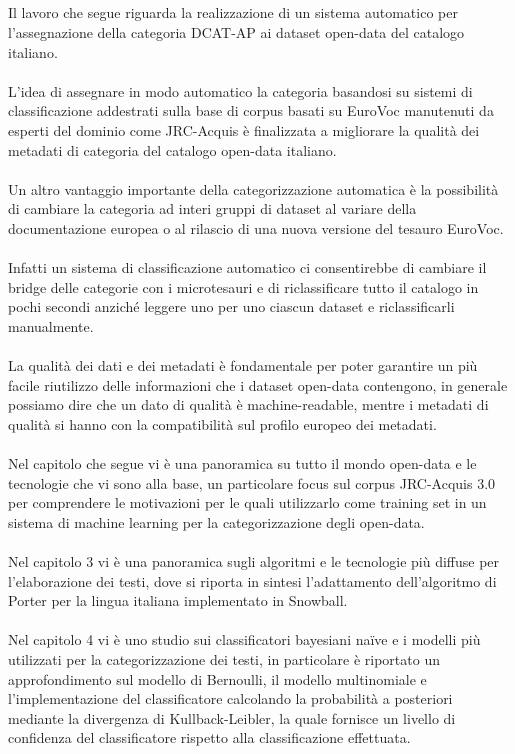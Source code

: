 \documentclass{article}
\theoremstyle{plain}
\theoremstyle{definition}
\begin{document}
\\
\\
\\
\\
Il lavoro che segue riguarda la realizzazione di un sistema automatico per l'assegnazione della categoria DCAT-AP ai dataset open-data del catalogo italiano.
\\
\\
L'idea di assegnare in modo automatico la categoria basandosi su sistemi di classificazione addestrati sulla base di corpus basati su EuroVoc manutenuti da esperti del dominio come JRC-Acquis è finalizzata a migliorare la qualità dei metadati di categoria del catalogo open-data italiano.
\\
\\
Un altro vantaggio importante della categorizzazione automatica è la possibilità di cambiare la categoria ad interi gruppi di dataset al variare della documentazione europea o al rilascio di una nuova versione del tesauro EuroVoc.
\\
\\
Infatti un sistema di classificazione automatico ci consentirebbe di cambiare il bridge delle categorie con i microtesauri e di riclassificare tutto il catalogo in pochi secondi anziché leggere uno per uno ciascun dataset e riclassificarli manualmente.
\\
\\
La qualità dei dati e dei metadati è fondamentale per poter garantire un più facile riutilizzo delle informazioni che i dataset open-data contengono, in generale possiamo dire che un dato di qualità è machine-readable, mentre i metadati di qualità si hanno con la compatibilità sul profilo europeo dei metadati.
\\
\\
Nel capitolo che segue vi è una panoramica su tutto il mondo open-data e le tecnologie che vi sono alla base, un particolare focus sul corpus JRC-Acquis 3.0 per comprendere le motivazioni per le quali utilizzarlo come training set in un sistema di machine learning per la categorizzazione degli open-data.
\\
\\
Nel capitolo 3 vi è una panoramica sugli algoritmi e le tecnologie più diffuse per l'elaborazione dei testi, dove si riporta in sintesi l'adattamento dell'algoritmo di Porter per la lingua italiana implementato in Snowball.
\\
\\
Nel capitolo 4 vi è uno studio sui classificatori bayesiani naïve e i modelli più utilizzati per la categorizzazione dei testi, in particolare è riportato un approfondimento sul modello di Bernoulli, il modello multinomiale e l'implementazione del classificatore calcolando la probabilità a posteriori mediante la divergenza di Kullback-Leibler, la quale fornisce un livello di confidenza del classificatore rispetto alla classificazione effettuata.
\end{document}
